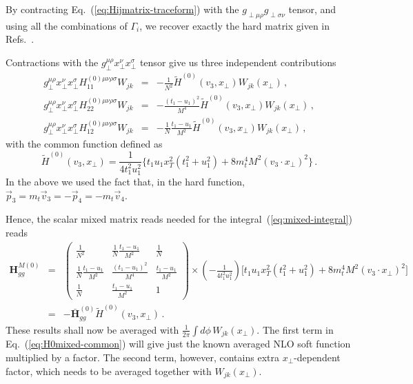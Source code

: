 \documentclass[a4paper,11pt]{report}
\numberwithin{equation}{section}
\begin{document}
By contracting Eq.~(\ref{eq:Hijmatrix-traceform}) with  the
$g_{\perp\mu\rho} g_{\perp\sigma\nu}$ tensor, and using all the combinations of 
$\Gamma_i$, we recover exactly the hard matrix given in 
Refs.~\cite{Li:2013mia, AntoniaMTh}.

Contractions with the $g_\perp^{\mu\rho} x_\perp^\nu x_\perp^\sigma$ tensor give
us three independent contributions
%
\begin{eqnarray}
  g_\perp^{\mu\rho} x_\perp^\nu x_\perp^\sigma
  H_{11}^{(0) \mu\nu\rho\sigma} W_{jk} 
  & = & 
  - \frac{1}{N^2} \tilde H^{(0)}(v_3, x_\perp)
  W_{jk}(x_\perp)\,,
  \label{eq:H11-contr}
  \\
  g_\perp^{\mu\rho} x_\perp^\nu x_\perp^\sigma
  H_{22}^{(0) \mu\nu\rho\sigma} W_{jk} 
  & = & 
  - \frac{(t_1-u_1)^2}{M^4} 
  \tilde H^{(0)}(v_3, x_\perp) W_{jk}(x_\perp)\,,
  \label{eq:H22-contr}
  \\
  g_\perp^{\mu\rho} x_\perp^\nu x_\perp^\sigma
  H_{12}^{(0) \mu\nu\rho\sigma} W_{jk} 
  & = & 
  - \frac{1}{N}  \frac{t_1-u_1}{M^2} 
  \tilde H^{(0)}(v_3, x_\perp) W_{jk}(x_\perp)\,,
  \label{eq:H12-contr}
\end{eqnarray}
%
with the common function defined as
%
\begin{equation}
  \tilde H^{(0)}(v_3, x_\perp) = 
  \frac{1}{4 t_1^2 u_1^2}
  \Big\{ t_1 u_1 x_T^2 (t_1^2+u_1^2) + 8 m_t^4 M^2 (v_3 \cdot x_\perp)^2
  \Big\}\,.
  \label{eq:H0mixed-common}
\end{equation}
%
In the above we used the fact that, in the hard function,
$\vec p_3 = m_t \vec v_3 = - \vec p_4 = - m_t \vec v_4$.

Hence, the scalar mixed matrix reads needed for
the integral~(\ref{eq:mixed-integral}) reads
%
\begin{eqnarray}
  \bm{H}_{gg}^{M(0)} & = &
  \left(\begin{array}{ccc}
  \frac{1}{N^2} & \frac{1}{N} \frac{t_1-u_1}{M^2} & \frac{1}{N} \\[0.5em]
  \frac{1}{N} \frac{t_1-u_1}{M^2} & \frac{(t_1-u_1)^2}{M^4} & 
  \frac{t_1-u_1}{M^2} \\[0.5em]
  \frac{1}{N} & \frac{t_1-u_1}{M^2} & 1
  \end{array}\right)
  \times
  \left(-\frac{1}{4 t_1^2 u_1^2}\right)
  \Big[ t_1 u_1 x_T^2 (t_1^2+u_1^2) + 8 m_t^4 M^2 (v_3 \cdot x_\perp)^2
  \Big]
  \nonumber \\[0.5em]
  & = &
  - \bm{\bar H}_{gg}^{(0)} \tilde H^{(0)}(v_3, x_\perp)\,.
\end{eqnarray}
%
These results shall now be
averaged with $\frac{1}{2\pi}\int d\phi\, W_{jk}(x_\perp)$.
%
The first term in Eq.~(\ref{eq:H0mixed-common}) will give just the known
averaged NLO soft function multiplied by a factor. The second term, however,
contains extra $x_\perp$-dependent factor, which needs to be averaged together
with $W_{jk}(x_\perp)$.
\end{document}
